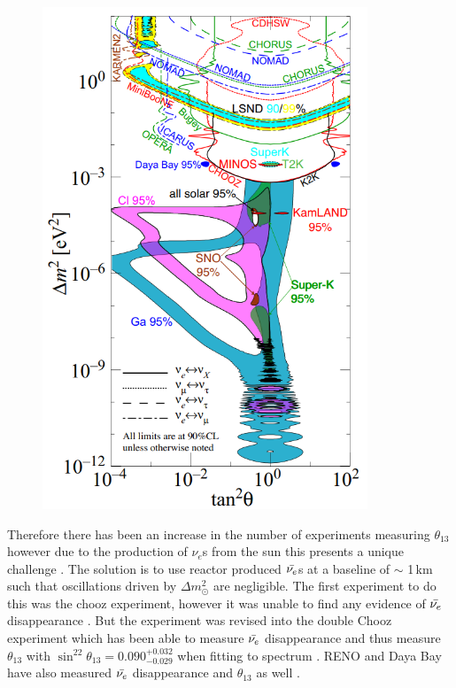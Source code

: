 \begin{figure}[htbp]
 \centering
 \includegraphics[height=150mm]{Chapter1/Figs/Raster/neutrino_angles_experiments_variations.png} %
 \label{neutrino_angles_experiments_variations}
\end{figure}
Therefore there has been an increase in the number of experiments measuring $\theta_{13}$ however due to the production of $\nu_e$s from the sun this presents a unique challenge \cite{Olive_2014}. The solution is to use reactor produced $\Bar{\nu_e}$s at a baseline of $\sim$ 1\,km such that oscillations driven by $\Delta m_\odot^2$ are negligible. The first experiment to do this was the chooz experiment, however it was unable to find any evidence of $\Bar{\nu_e}$ disappearance \cite{Olive_2014}. But the experiment was revised into the double Chooz experiment which has been able to measure $\Bar{\nu_e}$ disappearance and thus measure $\theta_{13}$ with $\sin^22\theta_{13} = 0.090^{+0.032}_{-0.029}$ when fitting to spectrum \cite{abe2014improved}. RENO and Daya Bay have also measured $\Bar{\nu_e}$ disappearance and $\theta_{13}$ as well \cite{Olive_2014}.  

